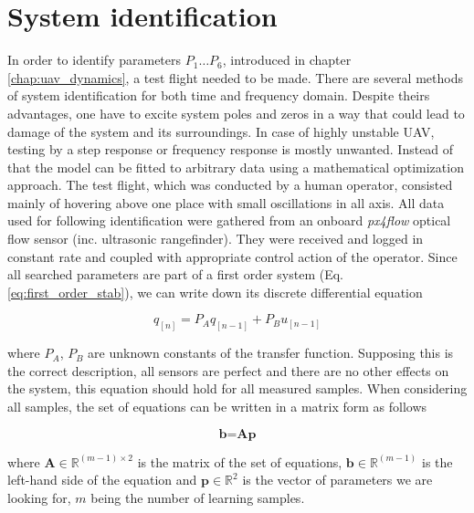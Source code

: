 \section{System identification}
\label{cap:system_identification}

In order to identify parameters $P_1 \hdots P_6$, introduced in chapter \ref{chap:uav_dynamics}, a test flight needed to be made. There are several methods of system identification for both time and frequency domain. Despite theirs advantages, one have to excite system poles and zeros in a way that could lead to damage of the system and its surroundings. In case of highly unstable UAV, testing by a step response or frequency response is mostly unwanted. Instead of that the model can be fitted to arbitrary data using a mathematical optimization approach. The test flight, which was conducted by a human operator, consisted mainly of hovering above one place with small oscillations in all axis. All data used for following identification were gathered from an onboard \emph{px4flow} optical flow sensor (inc. ultrasonic rangefinder). They were received and logged in constant rate and coupled with appropriate control action of the operator. Since all searched parameters are part of a first order system (Eq. \ref{eq:first_order_stab}), we can write down its discrete differential equation

\begin{equation}
q_{[n]} = P_Aq_{[n-1]} + P_Bu_{[n-1]}
\end{equation}

where $P_A$, $P_B$ are unknown constants of the transfer function. Supposing this is the correct description, all sensors are perfect and there are no other effects on the system, this equation should hold for all measured samples. When considering all samples, the set of equations can be written in a matrix form as follows

\begin{equation}
\textbf{b} = \textbf{A}\textbf{p}
\label{eq:bap}
\end{equation}

where $\textbf{A} \in \mathbb{R}^{(m-1)\times2}$ is the matrix of the set of equations, $\textbf{b} \in \mathbb{R}^{(m-1)}$ is the left-hand side of the equation and $\textbf{p} \in \mathbb{R}^{2}$ is the vector of parameters we are looking for, $m$ being the number of learning samples.

